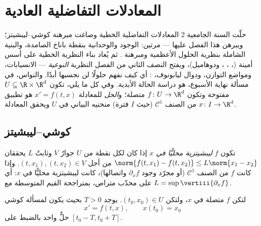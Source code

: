 \chapter{المعادلات التفاضلية العادية}\label{ch:b3:ode}

حلّت السنة الجامعية 2 المعادلات التفاضلية الخطية وصاغت مبرهنة
كوشي--ليبشيتز؛ ويبرهن هذا الفصل عليها --- مرتين: الوجود
والوحدانية بنقطة باناخ الصامدة، والبنية الشاملة بنظرية الحلول
الأعظمية ومبرهنة . ثم يُعاد بناء النظرية
الخطية على أسس أمينة (، ، ، ودوهاميل)، ويفتح النصف الثاني من الفصل النظرية
\emph{النوعية} --- الانسيابات، ومواضع التوازن، ودوال ليابونوف،
: أي كيف نفهم حلولًا لن نحسبها أبدًا.
والنواس، في مسألة نهاية الأسبوع، هو دراسة الحالة الأبدية. وفي
كل ما يلي، تكون $U \subseteq \R\times\R^d$ مفتوحة وتكون $f \colon U \to \R^d$ متصلة؛ و\emph{الحل}
للمعادلة $x' = f(t, x)$ هو تطبيق $x \colon I \to \R^d$ من الصنف $\mathcal C^1$
(حيث $I$ فترة) منحنيه البياني في $U$ ويحقق المعادلة.

\section{كوشي--ليبشيتز}

\begin{definition}\label{def:b3:ode:lipschitz}
تكون $f$ \emph{ليبشيتزية محليًّا في $x$} إذا كان لكل نقطة من $U$ جوارٌ $V$ وثابتٌ $L$ يحققان
$\norm{f(t, x_1) - f(t, x_2)} \leq L\norm{x_1 -
x_2}$ من أجل $(t, x_1), (t, x_2) \in V$. وإذا كانت $f$ من الصنف $\mathcal
C^1$ (أو مجرّد وجود
$\partial_xf$ واتصالها)، كانت ليبشيتزية محليًّا في $x$: أي على
 محدّب متراص، بمتراجحة القيم المتوسطة مع $L =
\sup\vertiii{\partial_xf}$.
\end{definition}

\begin{theorem}
\label{thm:b3:ode:cauchylipschitz}
لتكن $f$ متصلة  في $x$، ولتكن $(t_0,
x_0) \in U$. يوجد
$T > 0$ بحيث يكون لمسألة كوشي
\[
x' = f(t, x), \qquad x(t_0) = x_0
\]
حلٌّ واحد بالضبط على $[t_0 - T, t_0 +
T]$.
\end{theorem}

